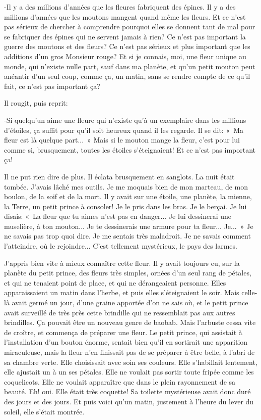 \documentclass{report}
\begin{document}
-Il y a des millions d'années que les fleures fabriquent des épines. Il y a des millions d'années que les moutons mangent quand même les fleurs. Et ce n'est pas sérieux de chercher à comprendre pourquoi elles se donnent tant de mal pour se fabriquer des épines qui ne servent jamais à rien? Ce n'est pas important la guerre des moutons et des fleurs? Ce n'est pas sérieux et plus important que les additions d'un gros Monsieur rouge? Et si je connais, moi, une fleur unique au monde, qui n'existe nulle part, sauf dans ma planète, et qu'un petit mouton peut anéantir d'un seul coup, comme ça, un matin, sans se rendre compte de ce qu'il fait, ce n'est pas important ça?

Il rougit, puis reprit:

-Si quelqu'un aime une fleure qui n'existe qu'à un exemplaire dans les millions d'étoiles, ça suffit pour qu'il soit heureux quand il les regarde. Il se dit: «~Ma fleur est là quelque part...~» Mais si le mouton mange la fleur, c'est pour lui comme si, brusquement, toutes les étoiles s'éteignaient! Et ce n'est pas important ça!

Il ne put rien dire de plus. Il éclata brusquement en sanglots. La nuit était tombée. J'avais lâché mes outils. Je me moquais bien de mon marteau, de mon boulon, de la soif et de la mort. Il y avait sur une étoile, une planète, la mienne, la Terre, un petit prince à consoler! Je le pris dans les bras. Je le berçai. Je lui disais: «~La fleur que tu aimes n'est pas en danger... Je lui dessinerai une muselière, à ton mouton... Je te dessinerais une armure pour ta fleur... Je...~» Je ne savais pas trop quoi dire. Je me sentais très maladroit. Je ne savais comment l'atteindre, où le rejoindre... C'est tellement mystérieux, le pays des larmes.

\parachapter[VIII]{} %
J'appris bien vite à mieux connaître cette fleur. Il y avait toujours eu, sur la planète du petit prince, des fleurs très simples, ornées d'un seul rang de pétales, et qui ne tenaient point de place, et qui ne dérangeaient personne. Elles apparaissaient un matin dans l'herbe, et puis elles s'éteignaient le soir. Mais celle-là avait germé un jour, d'une graine apportée d'on ne sais où, et le petit prince avait surveillé de très près cette brindille qui ne ressemblait pas aux autres brindilles. Ça pouvait être un nouveau genre de baobab. Mais l'arbuste cessa vite de croître, et commença de préparer une fleur. Le petit prince, qui assistait à l'installation d'un bouton énorme, sentait bien qu'il en sortirait une apparition miraculeuse, mais la fleur n'en finissait pas de se préparer à être belle, à l'abri de sa chambre verte. Elle choisissait avec soin ses couleurs. Elle s'habillait lentement, elle ajustait un à un ses pétales. Elle ne voulait pas sortir toute fripée comme les coquelicots. Elle ne voulait apparaître que dans le plein rayonnement de sa beauté. Eh! oui. Elle était très coquette! Sa toilette mystérieuse avait donc duré des jours et des jours. Et puis voici qu'un matin, justement à l'heure du lever du soleil, elle s'était montrée.
\end{document}
